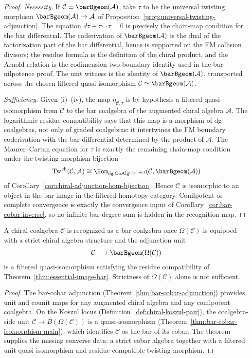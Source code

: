 \begin{proof}
\emph{Necessity.}
If $\mathcal{C}\simeq\barBgeom(\mathcal{A})$, take $\tau$ to be the
universal twisting morphism
$\barBgeom(\mathcal{A})\to\mathcal{A}$ of
Proposition~\ref{prop:universal-twisting-adjunction}. The equation
$d\tau+\tau\smile\tau=0$ is precisely the chain-map condition for the
bar differential. The coderivation of $\barBgeom(\mathcal{A})$ is the
dual of the factorization part of the bar differential, hence is
supported on the FM collision divisors; the residue formula is the
definition of the chiral product, and the Arnold relation is the
codimension-two boundary identity used in the bar nilpotence proof. The
unit witness is the identity of $\barBgeom(\mathcal{A})$, transported
across the chosen filtered quasi-isomorphism
$\mathcal{C}\simeq\barBgeom(\mathcal{A})$.

\emph{Sufficiency.}
Given (i)--(iv), the map
$\eta_{\mathcal{C},\tau}$ is by hypothesis a filtered
quasi-isomorphism from $\mathcal{C}$ to the bar coalgebra of the
augmented chiral algebra $\mathcal{A}$. The logarithmic residue
compatibility says that this map is a morphism of dg coalgebras, not
only of graded coalgebras: it intertwines the FM boundary coderivation
with the bar differential determined by the product of $\mathcal{A}$. The
Maurer--Cartan equation for $\tau$ is exactly the remaining chain-map
condition under the twisting-morphism bijection
\[
\mathrm{Tw}^{\mathrm{ch}}(\mathcal{C},\mathcal{A})
\cong
\Hom_{\mathrm{dg\,CoAlg}^{\mathrm{ch,conil}}}
(\mathcal{C},\barBgeom(\mathcal{A}))
\]
of Corollary~\ref{cor:chiral-adjunction-hom-bijection}. Hence
$\mathcal{C}$ is isomorphic to an object in the bar image in the
filtered homotopy category. Conilpotent or complete convergence is
exactly the convergence input of Corollary~\ref{cor:bar-cobar-inverse},
so no infinite bar-degree sum is hidden in the recognition map.
\end{proof}

\begin{corollary}
\label{cor:recognition-principle}
A chiral coalgebra $\mathcal{C}$ is recognized as a bar coalgebra once
$\Omega(\mathcal{C})$ is equipped with a strict chiral algebra structure
and the adjunction unit
\[
\mathcal{C}\longrightarrow \barBgeom(\Omega(\mathcal{C}))
\]
is a filtered quasi-isomorphism satisfying the residue compatibility of
Theorem~\ref{thm:essential-image-bar}. Strictness of
$\Omega(\mathcal{C})$ alone is not sufficient.
\end{corollary}
\begin{proof}
The bar-cobar adjunction (Theorem~\ref{thm:bar-cobar-adjunction})
provides unit and counit maps for any augmented chiral algebra and
any conilpotent coalgebra. On the Koszul locus
(Definition~\ref{def:chiral-koszul-pair}), the coalgebra-side unit
$\mathcal{C}\to\bar{B}(\Omega(\mathcal{C}))$ is a
quasi-isomorphism (Theorem~\ref{thm:bar-cobar-isomorphism-main}),
which identifies $\mathcal{C}$ as the bar of its cobar.
The theorem supplies the missing converse data: a strict cobar algebra
together with a filtered unit quasi-isomorphism and residue-compatible
twisting morphism.
\end{proof}

